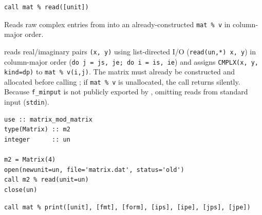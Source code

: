 
\lstset{language=[95]Fortran}
\begin{lstlisting}
call mat % read([unit])
\end{lstlisting}

Reads raw complex entries from  into an already-constructed \texttt{mat \% v} in column-major order.

 reads real/imaginary pairs \texttt{(x, y)} using list-directed I/O (\texttt{read(un,*) x, y}) in column-major order (\texttt{do j = js, je; do i = is, ie}) and assigns \texttt{CMPLX(x, y, kind=dp)} to \texttt{mat \% v(i,j)}. The matrix must already be constructed and allocated before calling ; if \texttt{mat \% v} is unallocated, the call returns silently. Because \texttt{f\_minput} is not publicly exported by , omitting  reads from standard input (\texttt{stdin}).

\begin{description}[leftmargin=2.2cm, style=nextline]
\end{description}

\lstset{language=[95]Fortran}
\begin{lstlisting}
use :: matrix_mod_matrix
type(Matrix) :: m2
integer      :: un

m2 = Matrix(4)
open(newunit=un, file='matrix.dat', status='old')
call m2 % read(unit=un)
close(un)
\end{lstlisting}


\lstset{language=[95]Fortran}
\begin{lstlisting}
call mat % print([unit], [fmt], [form], [ips], [ipe], [jps], [jpe])
\end{lstlisting}

